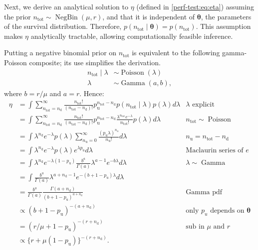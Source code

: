 \documentclass{article}
\def\dist{\sim}
\DeclareMathOperator{\Poi}{Poisson}
\DeclareMathOperator{\NBr}{NegBin}
\newcommand{\NBc}{\NBr}
\DeclareMathOperator{\GamDist}{Gamma}
\renewcommand{\vec}[1]{\bm{#1}}
\newcommand{\ntot}{n_\text{tot}}
\newcommand{\ndet}{n_\text{d}}
\newcommand{\nnodet}{n_\text{u}}
\newcommand{\pnodet}{p_\text{u}}
\begin{document}
Next, we derive an analytical solution to $\eta$ (defined in \cref{perf-test:eq:eta}) assuming the prior $\ntot \dist \NBc(\mu, r)$, and that it is independent of $\vec{\theta}$, the parameters of the survival distribution.
Therefore, $p(\ntot \mid \vec{\theta}) = p(\ntot)$.
This assumption makes $\eta$ analytically tractable, allowing computationally feasible inference.

Putting a negative binomial prior on $\ntot$ is equivalent to the following gamma-Poisson composite; its use simplifies the derivation.
\begin{align}
\ntot \mid \lambda &\dist \Poi(\lambda) \\
\lambda &\dist \GamDist(a, b),
\end{align}
where $b = r / \mu$ and $a = r$.
Hence:
\begin{align}
\eta
&= \int \sum_{\ntot=\ndet}^\infty \frac{\ntot!}{(\ntot-\ndet)!} \pnodet^{\ntot-\ndet} p(\ntot \mid \lambda) p(\lambda) d\lambda &\text{$\lambda$ explicit}\\
&= \int \sum_{\ntot=\ndet}^\infty \frac{\ntot!}{(\ntot-\ndet)!} \pnodet^{\ntot-\ndet} \frac{\lambda^{\ntot} e^{-\lambda}}{\ntot!} p(\lambda) d\lambda &\ntot \dist \Poi\\
&= \int \lambda^{\ndet} e^{-\lambda} p(\lambda) \sum_{\nnodet=0}^\infty \frac{(\pnodet \lambda)^{\nnodet}}{\nnodet!} d\lambda &\nnodet = \ntot-\ndet\\
&= \int \lambda^{\ndet} e^{-\lambda} p(\lambda) e^{\lambda \pnodet} d\lambda &\text{Maclaurin series of $e$} \\
&= \int \lambda^{\ndet} e^{-\lambda(1 - \pnodet)} \frac{b^a}{\Gamma(a)} \lambda^{a-1} e^{-b\lambda} d\lambda &\lambda \dist \GamDist\\
&= \int \frac{b^a}{\Gamma(a)} \lambda^{a+\ndet-1} e^{-(b+1-\pnodet)\lambda} d\lambda \\
&= \frac{b^a}{\Gamma(a)} \frac{\Gamma(a+\ndet)}{(b+1-\pnodet)^{a+\ndet}} &\text{Gamma pdf}\\
&\propto (b+1-\pnodet)^{-(a+\ndet)} &\text{only $p_u$ depends on $\vec{\theta}$}\\
&= (r/\mu + 1 - \pnodet)^{-(r+\ndet)} &\text{sub in $\mu$ and $r$}\\
&\propto\{r + \mu (1- \pnodet)\}^{-(r+\ndet)}.
\end{align}
\end{document}
